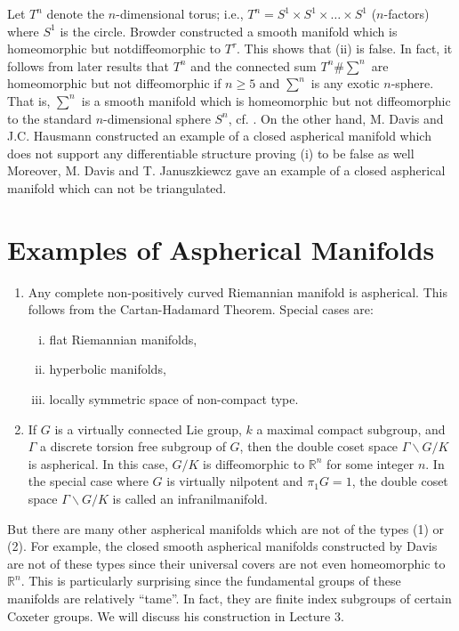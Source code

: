 Let $T^n$ denote the $n$-dimensional torus; i.e., $T^n = S^1 \times
S^1 \times \ldots \times S^1$ ($n$-factors) where $S^1$ is the
circle. Browder \cite{13} constructed a smooth manifold which is
homeomorphic but not\pageoriginale diffeomorphic to $T^\tau$. This
shows that (ii) is false. In fact, it follows from later results that
$T^n$ and the connected sum $T^n \# \sum^n$ are homeomorphic but not
diffeomorphic if $n \geq 5$ and $\sum^n$ is any exotic
$n$-sphere. That is,  $\sum^n$ is a smooth manifold which is
homeomorphic but not diffeomorphic to the standard $n$-dimensional
sphere $S^n$, cf. \cite{65}. On the other hand, M. Davis and
J.C. Hausmann \cite{23} constructed an example of a closed aspherical
manifold which does not support any differentiable structure proving
(i) to be false as well Moreover, M. Davis and T. Januszkiewcz
\cite{24} gave an example of a closed aspherical manifold which can
not be triangulated.

\setcounter{section}{3}
\section{Examples of Aspherical Manifolds}\label{c1:sec1.4}

\begin{enumerate}[(1)]
\item Any complete non-positively curved Riemannian manifold is
  aspherical. This follows from the Cartan-Hadamard Theorem. Special
  cases are:
  \begin{enumerate}[(i)]
    \item flat Riemannian manifolds,
      \item hyperbolic manifolds,
        \item locally symmetric space of non-compact type.
  \end{enumerate}
  \item If $G$ is a virtually connected Lie group, $k$ a maximal
    compact subgroup, and $\Gamma$ a discrete  torsion free subgroup
    of $G$, then the double coset space $\Gamma\backslash G/K$ is
    aspherical. In this case, $G/K$ is diffeomorphic to $\mathbb{R}^n$
    for some integer $n$. In the special case where $G$ is virtually
    nilpotent and $\pi_1 G=1$, the double coset space
    $\Gamma\backslash G/K$ is called an infranilmanifold.
\end{enumerate}

But there are many other aspherical manifolds which are not of the
types (1) or (2). For example, the closed smooth aspherical manifolds
constructed by Davis \cite{21} are not of these types since their
universal covers are not even homeomorphic to $\mathbb{R}^n$. This is
particularly surprising since the fundamental groups of these
manifolds are relatively ``tame''. In fact, they are finite index
subgroups of certain Coxeter groups. We will discuss his construction
in Lecture 3.


